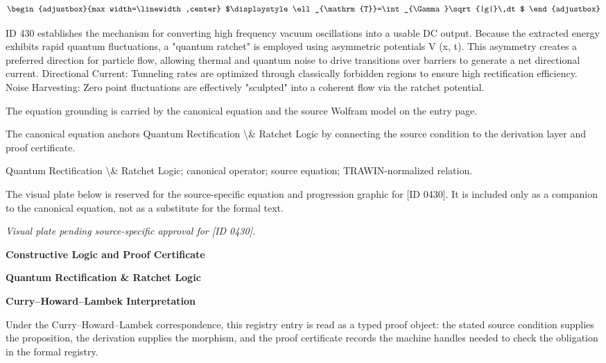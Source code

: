 \[
\begin{adjustbox}{max width=\linewidth,center}
$\displaystyle
\ell_{\mathrm{T}}=\int_{\Gamma}\sqrt{|g|}\,dt
$
\end{adjustbox}
\]

ID 430 establishes the mechanism for converting high frequency vacuum oscillations into a usable DC output. Because the extracted energy exhibits rapid quantum fluctuations, a "quantum ratchet" is employed using asymmetric potentials V (x, t). This asymmetry creates a preferred direction for particle flow, allowing thermal and quantum noise to drive transitions over barriers to generate a net directional current. Directional Current: Tunneling rates are optimized through classically forbidden regions to ensure high rectification efficiency. Noise Harvesting: Zero point fluctuations are effectively "sculpted" into a coherent flow via the ratchet potential.

The equation grounding is carried by the canonical equation and the source Wolfram model on the entry page.

The canonical equation anchors Quantum Rectification \textbackslash{}\& Ratchet Logic by connecting the source condition to the derivation layer and proof certificate.

Quantum Rectification \textbackslash{}\& Ratchet Logic; canonical operator; source equation; TRAWIN-normalized relation.
\endgroup

\begingroup\footnotesize\sloppy
The visual plate below is reserved for the source-specific equation and progression graphic for [ID 0430]. It is included only as a companion to the canonical equation, not as a substitute for the formal text.
\par\endgroup
\begingroup\footnotesize\itshape
Visual plate pending source-specific approval for [ID 0430].
\par\endgroup

\clearpage
\begingroup\tzpsupportsetup
\noindent\textbf{\fontsize{10.8pt}{12.8pt}\selectfont [ID 0430] Constructive Logic and Proof Certificate}\par
\noindent\textbf{\fontsize{10pt}{12pt}\selectfont Quantum Rectification \& Ratchet Logic}\par
\vspace{0.45em}
\begingroup
\footnotesize
\setlength{\parskip}{0.22em}
\setlength{\parindent}{0pt}
\noindent\textbf{Curry--Howard--Lambek Interpretation}\par
Under the Curry--Howard--Lambek correspondence, this registry entry is read as a typed proof
object: the stated source condition supplies the proposition, the derivation supplies the
morphism, and the proof certificate records the machine handles needed to check the obligation
in the formal registry.

